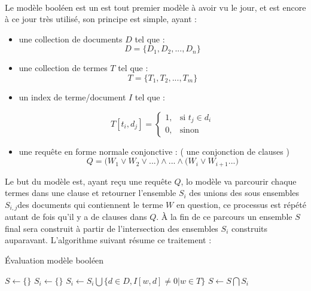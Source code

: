 \documentclass[12pt]{report}
\begin{document}
			\paragraph{}
			Le modèle booléen est un est tout premier modèle à avoir vu le jour, et est encore à ce jour très utilisé, son
			principe est simple, ayant :
			\begin{itemize} 
				\item une collection de documents $D$ tel que :
				\begin{equation*}
					D = \lbrace D_1,D_2,...,D_n\rbrace
				\end{equation*}
				
				\item une collection de termes $T$ tel que : 
				\begin{equation*}
				T = \lbrace T_1,T_2,...,T_m\rbrace
				\end{equation*}
				
				\item un index de terme/document $I$ tel que : 
				
				\[
				T[t_i,d_j]= 
				\begin{cases}
				1,& \text{si } t_j \in d_i\\
				0,              & \text{sinon}
				\end{cases}
				\]
				
				\item une requête en forme normale conjonctive : ( une conjonction de clauses )
				\begin{equation}
					Q = \lparen W_1 \lor W_2 \lor ... \rparen \land ... \land \lparen W_i \lor W_{i+1} ... \rparen
				\end{equation}
			\end{itemize}
			\par 
			Le but du modèle est, ayant reçu une requête $Q$, lo modèle va parcourir chaque termes dans une clause et 
			retourner l'ensemble $S_i$ des unions des sous ensembles $S_{i,j} $des documents qui contiennent le terme
			$W$ en question, ce processus est répété autant de fois qu'il y a de clauses dans $Q$. À la fin de ce parcours 
			un ensemble $S$ final sera construit à partir de l'intersection des ensembles $S_i$ construits auparavant.
			L'algorithme suivant résume ce traitement : 
			
			\begin{algorithm}[H]
				\caption{Évaluation modèle booléen}
				
				
				
				\Begin
				{
					$S \gets \lbrace \rbrace $
					{
						$S_i \gets \lbrace \rbrace$
						{
							$S_{i} \gets S_i \bigcup \lbrace d \in D , I[w,d] \neq 0 | w \in T \rbrace$
						}
					$S \gets S \bigcap S_i$
					}
					
				}
			\end{algorithm}
			
\end{document}
